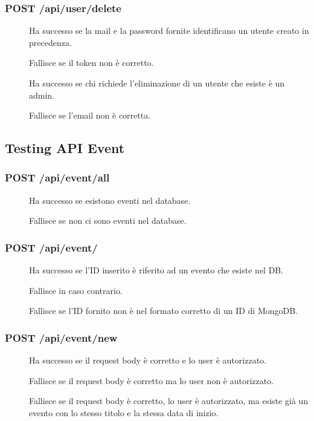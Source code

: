 \documentclass{article}
\begin{document}
\subsubsection{POST /api/user/delete}
\begin{description}
    \item[] Ha successo se la mail e la password fornite identificano un utente creato in precedenza.
    \item[] Fallisce se il token non è corretto.
    \item[] Ha successo se chi richiede l'eliminazione di un utente che esiste è un admin.
    \item[] Fallisce se l'email non è corretta.
\end{description}
\subsection{Testing API Event}
\subsubsection{POST /api/event/all}
\begin{description}
    \item[] Ha successo se esistono eventi nel database.
    \item[] Fallisce se non ci sono eventi nel database.
\end{description}
\subsubsection{POST /api/event/}
\begin{description}
    \item[] Ha successo se l'ID inserito è riferito ad un evento che esiste nel DB.
    \item[] Fallisce in caso contrario.
    \item[] Fallisce se l'ID fornito non è nel formato corretto di un ID di MongoDB.
\end{description}
\subsubsection{POST /api/event/new}
\begin{description}
    \item[] Ha successo se il request body è corretto e lo user è autorizzato.
    \item[] Fallisce se il request body è corretto ma lo user non è autorizzato.
    \item[] Fallisce se il request body è corretto, lo user è autorizzato, ma esiste già un evento con lo stesso titolo e la stessa data di inizio.
\end{description}
\end{document}
